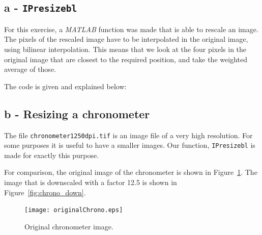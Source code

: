 \subsection*{a - \texttt{IPresizebl}}
For this exercise, a \textit{MATLAB} function was made that is able to rescale an image.
The pixels of the rescaled image have to be interpolated in the original image, using bilinear interpolation.
This means that we look at the four pixels in the original image that are closest to the required position, and take the weighted average of those.

The code is given and explained below:

\subsection*{b - Resizing a chronometer}
The file \texttt{chronometer1250dpi.tif} is an image file of a very high resolution.
For some purposes it is useful to have a smaller images.
Our function, \texttt{IPresizebl} is made for exactly this purpose.

For comparison, the original image of the chronometer is shown in Figure~\ref{fig:chrono_original0}.
The image that is downscaled with a factor 12.5 is shown in Figure~\ref{fig:chrono_down}.

\begin{figure}[!Htb]
 \centering
 \texttt{[image: originalChrono.eps]}
 \caption{Original chronometer image.}
 \label{fig:chrono_original0}
\end{figure}

